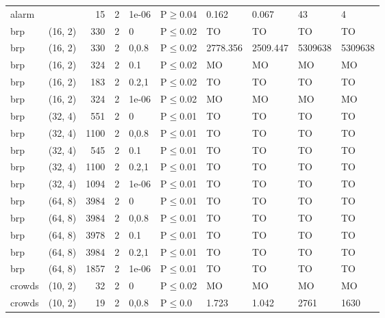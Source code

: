 \begin{longtable}{llrrllllll}
 alarm         &           &     	15 &   2 & 1e-06 & P$\geq$0.04  & 0.162    & 0.067    & 43      & 4       \\
 brp           & (16, 2)   &    	330 &   2 & 0     & P$\leq$0.02  & TO       & TO       & TO      & TO      \\
 brp           & (16, 2)   &    	330 &   2 & 0,0.8 & P$\leq$0.02  & 2778.356 & 2509.447 & 5309638 & 5309638 \\
 brp           & (16, 2)   &    	324 &   2 & 0.1   & P$\leq$0.02  & MO       & MO       & MO      & MO      \\
 brp           & (16, 2)   &    	183 &   2 & 0.2,1 & P$\leq$0.02  & TO       & TO       & TO      & TO      \\
 brp           & (16, 2)   &    	324 &   2 & 1e-06 & P$\leq$0.02  & MO       & MO       & MO      & MO      \\
 brp           & (32, 4)   &    	551 &   2 & 0     & P$\leq$0.01  & TO       & TO       & TO      & TO      \\
 brp           & (32, 4)   &   	1100 &   2 & 0,0.8 & P$\leq$0.01  & TO       & TO       & TO      & TO      \\
 brp           & (32, 4)   &    	545 &   2 & 0.1   & P$\leq$0.01  & TO       & TO       & TO      & TO      \\
 brp           & (32, 4)   &   	1100 &   2 & 0.2,1 & P$\leq$0.01  & TO       & TO       & TO      & TO      \\
 brp           & (32, 4)   &   	1094 &   2 & 1e-06 & P$\leq$0.01  & TO       & TO       & TO      & TO      \\
 brp           & (64, 8)   &   	3984 &   2 & 0     & P$\leq$0.01  & TO       & TO       & TO      & TO      \\
 brp           & (64, 8)   &   	3984 &   2 & 0,0.8 & P$\leq$0.01  & TO       & TO       & TO      & TO      \\
 brp           & (64, 8)   &   	3978 &   2 & 0.1   & P$\leq$0.01  & TO       & TO       & TO      & TO      \\
 brp           & (64, 8)   &   	3984 &   2 & 0.2,1 & P$\leq$0.01  & TO       & TO       & TO      & TO      \\
 brp           & (64, 8)   &   	1857 &   2 & 1e-06 & P$\leq$0.01  & TO       & TO       & TO      & TO      \\
 crowds        & (10, 2)   &     	32 &   2 & 0     & P$\leq$0.02  & MO       & MO       & MO      & MO      \\
 crowds        & (10, 2)   &     	19 &   2 & 0,0.8 & P$\leq$0.0   & 1.723    & 1.042    & 2761    & 1630    \\

\end{longtable}
